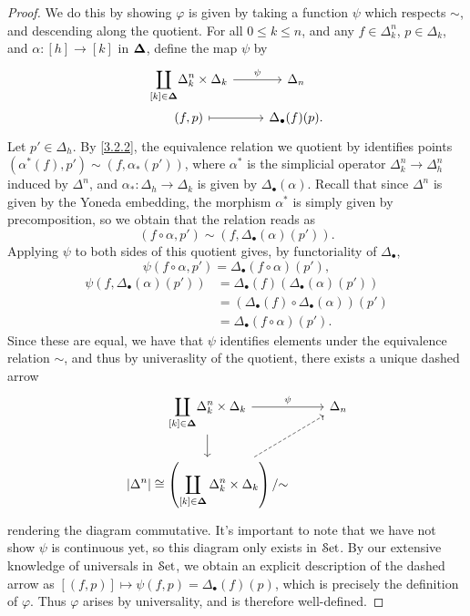 \begin{proof}
    We do this by showing $\varphi $ is given by taking a function $\psi $ which respects $\sim $, and descending along the quotient. For all $0\leq k\leq n$, and any $f\in\Delta^n_k$, $p\in\Delta_k$, and $\alpha : [h]\to[k]$ in $\boldsymbol{\Delta}$, define the map $\psi$ by
    \[\begin{tikzcd}[row sep=0em]
	{\displaystyle{\coprod_{[k]\in\BD}}\Delta^n_k\times\Delta_k} & {\Delta_n} \\
	{(f,p)} & {\Delta_\bullet(f)(p).}
	\arrow["\psi", from=1-1, to=1-2]
	\arrow[maps to, from=2-1, to=2-2]
    \end{tikzcd}\]
     Let $p'\in \Delta _h$. By \cref{3.2.2}, the equivalence relation we quotient by identifies points $(\alpha^*(f),p')\sim(f,\alpha_*(p'))$, where $\alpha^*$ is the simplicial operator $\Delta^n_k\to\Delta^n_h$ induced by $\Delta^n$, and $\alpha_* : \Delta_h\to\Delta_k$ is given by $\Delta_\bullet(\alpha)$. Recall that since $\Delta^n$ is given by the Yoneda embedding, the morphism $\alpha^*$ is simply given by precomposition, so we obtain that the relation reads as
    \[
    (f\circ \alpha,p')\sim(f,\Delta_\bullet(\alpha)(p')).
    \]
    Applying $\psi$ to both sides of this quotient gives, by functoriality of $\Delta_\bullet$,
    \[
    	\psi (f\circ \alpha ,p') = \Delta_{\bullet} (f\circ \alpha )(p'),
    \]
    \begin{align*}
	    \psi (f, \Delta _{\bullet} (\alpha )(p'))&=\Delta _{\bullet} (f)(\Delta _{\bullet} (\alpha )(p'))\\
						     &=(\Delta _{\bullet} (f)\circ \Delta _{\bullet} (\alpha ))(p')\\
						     &=\Delta _{\bullet} (f\circ \alpha )(p')
    .\end{align*}
    Since these are equal, we have that $\psi$ identifies elements under the equivalence relation $\sim$, and thus by univeraslity of the quotient, there exists a unique dashed arrow
    \[\begin{tikzcd}
	{\displaystyle{\coprod_{[k]\in\BD}}\Delta^n_k\times\Delta_k} & {\Delta_n} \\
	{\displaystyle{\left|\Delta^n\right|\cong\left(\coprod_{[k]\in\BD}\Delta^n_k\times\Delta_k\right)/\tildesim}}
	\arrow["\psi", from=1-1, to=1-2]
	\arrow[from=1-1, to=2-1]
	\arrow[dashed, from=2-1, to=1-2]
    \end{tikzcd}\]
    rendering the diagram commutative. It's important to note that we have not show $\psi $ is continuous yet, so this diagram only exists in $\mathcal{S}\mathrm{et} $. By our extensive knowledge of universals in $\mathcal{S}\mathrm{et}$, we obtain an explicit description of the dashed arrow as $[(f,p)]\mapsto \psi(f,p)=\Delta_\bullet(f)(p)$, which is precisely the definition of $\varphi$. Thus $\varphi$ arises by universality, and is therefore well-defined.


\end{proof}
